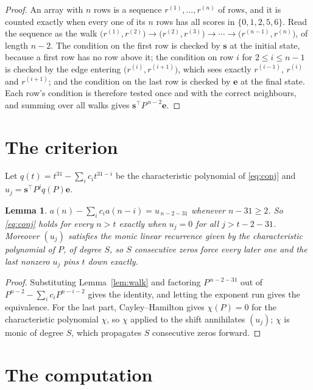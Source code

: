 \documentclass[11pt,a4paper]{article}
\theoremstyle{plain}
\newtheorem{lemma}[theorem]{Lemma}
\theoremstyle{definition}
\begin{document}
\begin{proof}
An array with $n$ rows is a sequence $r^{(1)},\dots,r^{(n)}$ of rows, and it is counted
exactly when every one of its $n$ rows has all scores in $\{0,1,2,5,6\}$. Read the sequence as the
walk $\bigl(r^{(1)},r^{(2)}\bigr)\to\bigl(r^{(2)},r^{(3)}\bigr)\to\cdots\to
\bigl(r^{(n-1)},r^{(n)}\bigr)$, of length $n-2$. The condition on the first row is
checked by $\mathbf{s}$ at the initial state, because a first row has no row above it; the
condition on row $i$ for $2\le i\le n-1$ is checked by the edge entering
$\bigl(r^{(i)},r^{(i+1)}\bigr)$, which sees exactly $r^{(i-1)}$, $r^{(i)}$ and
$r^{(i+1)}$; and the condition on the last row is checked by $\mathbf{e}$ at the final
state. Each row's condition is therefore tested once and with the correct neighbours, and
summing over all walks gives $\mathbf{s}^{\!\top}P^{\,n-2}\mathbf{e}$.
\end{proof}

\section{The criterion}

Let $q(t)=t^{31}-\sum_i c_i t^{31-i}$ be the characteristic polynomial of
\eqref{eq:conj} and $u_j=\mathbf{s}^{\!\top}P^{j}q(P)\mathbf{e}$.

\begin{lemma}\label{lem:crit}
$a(n)-\sum_i c_i a(n-i)=u_{\,n-2-31}$ whenever $n-31\ge2$. So \eqref{eq:conj}
holds for every $n>t$ exactly when $u_j=0$ for all $j>t-2-31$. Moreover $(u_j)$
satisfies the monic linear recurrence given by the characteristic polynomial of $P$, of
degree $S$, so $S$ consecutive zeros force every later one and the last nonzero $u_j$ pins
$t$ down exactly.
\end{lemma}

\begin{proof}
Substituting Lemma~\ref{lem:walk} and factoring $P^{\,n-2-31}$ out of
$P^{n-2}-\sum_i c_i P^{n-i-2}$ gives the identity, and letting the exponent run gives the
equivalence. For the last part, Cayley--Hamilton gives $\chi(P)=0$ for the characteristic
polynomial $\chi$, so $\chi$ applied to the shift annihilates $(u_j)$; $\chi$ is monic of
degree $S$, which propagates $S$ consecutive zeros forward.
\end{proof}

\section{The computation}
\end{document}
